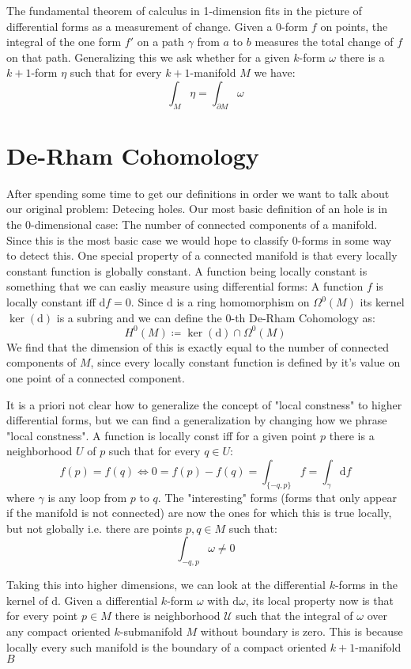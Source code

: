 The fundamental theorem of calculus in 1-dimension fits in the picture of differential
forms as a measurement of change. Given a $0$-form $f$ on points, the integral of the
one form $f'$ on a path $\gamma$ from $a$ to $b$ measures the total change of $f$
on that path. Generalizing this we ask whether for a given $k$-form $\omega$ there
is a $k + 1$-form $\eta$ such that for every $k+1$-manifold $M$ we have:
\[
	\int_M \eta = \int_{\partial M} \omega
\]
\section{De-Rham Cohomology}
After spending some time to get our definitions in order we want to talk about
our original problem: Detecing holes. Our most basic definition of an hole is
in the $0$-dimensional case: The number of connected components of a manifold.
Since this is the most basic case we would hope to classify $0$-forms in some
way to detect this. One special property of a connected manifold is that every
locally constant function is globally constant. A function being locally constant
is something that we can easliy measure using differential forms: A function $f$ is
locally constant iff $\mathrm{d}f = 0$. Since $\mathrm{d}$ is a ring homomorphism
on $\Omega^0(M)$ its kernel $\ker(\mathrm{d})$ is a subring and we can define
the 0-th De-Rham Cohomology as:
\[
	H^0(M) \coloneqq \ker(\mathrm{d}) \cap \Omega^0(M)
\]
We find that the dimension of this is exactly equal to the number of connected components
of $M$, since every locally constant function is defined by it's value on one point of a
connected component.

It is a priori not clear how to generalize the concept of "local constness" to higher differential
forms, but we can find a generalization by changing how we phrase "local constness".
A function is locally const iff for a given point $p$ there is a neighborhood $U$ of $p$ such that for
every $q \in U$:
\[
	f(p) = f(q) \iff 0 = f(p) - f(q) = \int_{\{-q, p\}} f = \int_\gamma \mathrm{d} f
\]
where $\gamma$ is any loop from $p$ to $q$. The "interesting" forms (forms that only appear
if the manifold is not connected) are now the ones for which this is true locally, but not globally
i.e. there are points $p, q \in M$ such that:
\[
	\int_{-q, p} \omega \neq 0
\]

Taking this into higher dimensions, we can look at the differential $k$-forms in the kernel
of $\mathrm{d}$. Given a differential $k$-form $\omega$ with $\mathrm{d}\omega$, its local property
now is that for every point $p \in M$ there is neighborhood $\mathcal{U}$ such that the integral
of $\omega$ over any compact oriented $k$-submanifold $M$ without boundary is zero. This is because
locally every such manifold is the boundary of a compact oriented $k+1$-manifold $B$

